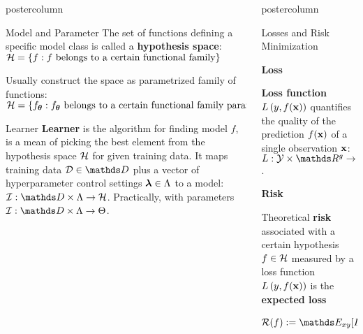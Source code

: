 \documentclass{beamer}
\begin{document}
\begin{frame}[fragile]{}
\begin{columns}
\begin{column}{.31\textwidth}
\begin{beamercolorbox}[center]{postercolumn}
\begin{minipage}{.98\textwidth}
{\begin{myblock}{Model and Parameter}
    The set of functions defining a specific model class is called a 
    \textbf{hypothesis space}: $\mathcal{H} = \{f: f \text{ belongs to a certain functional family}\}$

    Usually construct the space as parametrized family of functions:
    $\mathcal{H} = \{f_{\bm{\theta}}: f_{\bm{\theta}} \text{ belongs to a certain functional family parameterized by } \bm{\theta}\}$

  \end{myblock}

  \begin{myblock}{Learner}
    \textbf{Learner} is the algorithm for finding model $f$, is a mean of picking the best element from the hypothesis space $\mathcal{H}$
  for given training data.
  It maps training data $\D \in \allDatasets$ plus a vector of hyperparameter control settings $\bm{\lambda} \in \Lambda$ to a model:
  $ \ind: \preimageInducerShort \rightarrow \Hspace$. 
  Practically, with parameters $\ind: \preimageInducerShort \rightarrow \Theta$.
\end{myblock}

}
\end{minipage}
\end{beamercolorbox}
\end{column}


\begin{column}{.31\textwidth}
\begin{beamercolorbox}[center]{postercolumn}
\begin{minipage}{.98\textwidth}
\parbox[t][\columnheight]{\textwidth}{

  \begin{myblock}{Losses and Risk Minimization}
  
  \begin{codebox}
  \textbf{Loss}	
  \end{codebox}
  \textbf{Loss function} $L\left(y, f(\mathbf{x})\right)$ quantifies the quality of the prediction $f(\mathbf{x})$ of a single observation $\mathbf{x}$:
    $L: \Yspace \times \R^g \to \R$.


  \begin{codebox}
  \textbf{Risk}
  \end{codebox}
  Theoretical \textbf{risk} associated with a certain hypothesis $f \in \mathcal{H}$ measured by a loss function $L\left(y, f(\mathbf{x})\right)$ is the \textbf{expected loss}
  $$ \riskf := \E_{xy} [\Lxy] = \int \Lxy \text{d}\Pxy $$
  

\end{myblock}}
\end{minipage}
\end{beamercolorbox}
\end{column}
\end{columns}
\end{frame}
\end{document}
